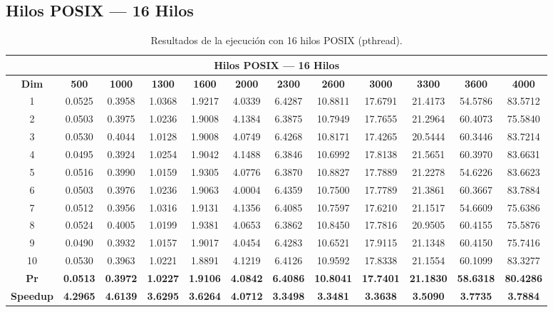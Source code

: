 \documentclass{article}
\begin{document}

\subsection{Hilos POSIX --- 16 Hilos}

\begin{table}[H]
\centering
\tiny
\begin{tabular}{|c|c|c|c|c|c|c|c|c|c|c|c|}
\hline
\multicolumn{12}{|c|}{\textbf{Hilos POSIX --- 16 Hilos}} \\
\hline
\textbf{Dim} & \textbf{500} & \textbf{1000} & \textbf{1300} & \textbf{1600} & \textbf{2000} & \textbf{2300} & \textbf{2600} & \textbf{3000} & \textbf{3300} & \textbf{3600} & \textbf{4000} \\
\hline
1  & 0.0525 & 0.3958 & 1.0368 & 1.9217 & 4.0339 & 6.4287 & 10.8811 & 17.6791 & 21.4173 & 54.5786 & 83.5712 \\
2  & 0.0503 & 0.3975 & 1.0236 & 1.9008 & 4.1384 & 6.3875 & 10.7949 & 17.7655 & 21.2964 & 60.4073 & 75.5840 \\
3  & 0.0530 & 0.4044 & 1.0128 & 1.9008 & 4.0749 & 6.4268 & 10.8171 & 17.4265 & 20.5444 & 60.3446 & 83.7214 \\
4  & 0.0495 & 0.3924 & 1.0254 & 1.9042 & 4.1488 & 6.3846 & 10.6992 & 17.8138 & 21.5651 & 60.3970 & 83.6631 \\
5  & 0.0516 & 0.3990 & 1.0159 & 1.9305 & 4.0776 & 6.3870 & 10.8827 & 17.7889 & 21.2278 & 54.6226 & 83.6623 \\
6  & 0.0503 & 0.3976 & 1.0236 & 1.9063 & 4.0004 & 6.4359 & 10.7500 & 17.7789 & 21.3861 & 60.3667 & 83.7884 \\
7  & 0.0512 & 0.3956 & 1.0316 & 1.9131 & 4.1356 & 6.4085 & 10.7597 & 17.6210 & 21.1517 & 54.6609 & 75.6386 \\
8  & 0.0524 & 0.4005 & 1.0199 & 1.9381 & 4.0653 & 6.3862 & 10.8450 & 17.7816 & 20.9505 & 60.4155 & 75.5876 \\
9  & 0.0490 & 0.3932 & 1.0157 & 1.9017 & 4.0454 & 6.4283 & 10.6521 & 17.9115 & 21.1348 & 60.4150 & 75.7416 \\
10 & 0.0530 & 0.3963 & 1.0221 & 1.8891 & 4.1219 & 6.4126 & 10.9592 & 17.8338 & 21.1554 & 60.1099 & 83.3277 \\
\hline
\textbf{Pr} & \textbf{0.0513} & \textbf{0.3972} & \textbf{1.0227} & \textbf{1.9106} & \textbf{4.0842} & \textbf{6.4086} & \textbf{10.8041} & \textbf{17.7401} & \textbf{21.1830} & \textbf{58.6318} & \textbf{80.4286} \\
\hline
\textbf{Speedup} & \textbf{4.2965} & \textbf{4.6139} & \textbf{3.6295} & \textbf{3.6264} & \textbf{4.0712} & \textbf{3.3498} & \textbf{3.3481} & \textbf{3.3638} & \textbf{3.5090} & \textbf{3.7735} & \textbf{3.7884} \\
\hline
\end{tabular}
\caption{Resultados de la ejecución con 16 hilos POSIX (pthread).}
\label{tab:t16}
\end{table}
\end{document}
